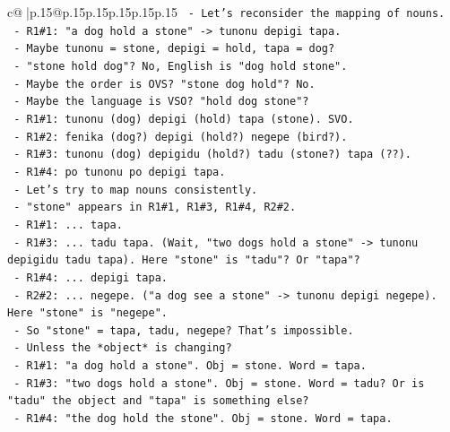 \documentclass{article}
\begin{document}
{\begin{supertabular}{c@{$\;$}|p{.15\linewidth}@{}p{.15\linewidth}p{.15\linewidth}p{.15\linewidth}p{.15\linewidth}p{.15\linewidth}}
{{{\texttt{              {-} Let's reconsider the mapping of nouns.} \\
\texttt{              {-} R1\#1: "a dog hold a stone" {-}> tunonu depigi tapa.} \\
\texttt{                {-} Maybe tunonu = stone, depigi = hold, tapa = dog?} \\
\texttt{                {-} "stone hold dog"? No, English is "dog hold stone".} \\
\texttt{                {-} Maybe the order is OVS? "stone dog hold"? No.} \\
\texttt{                {-} Maybe the language is VSO? "hold dog stone"?} \\
\texttt{                  {-} R1\#1: tunonu (dog) depigi (hold) tapa (stone). SVO.} \\
\texttt{                  {-} R1\#2: fenika (dog?) depigi (hold?) negepe (bird?).} \\
\texttt{                  {-} R1\#3: tunonu (dog) depigidu (hold?) tadu (stone?) tapa (??).} \\
\texttt{                  {-} R1\#4: po tunonu po depigi tapa.} \\
\texttt{              {-} Let's try to map nouns consistently.} \\
\texttt{                {-} "stone" appears in R1\#1, R1\#3, R1\#4, R2\#2.} \\
\texttt{                  {-} R1\#1: ... tapa.} \\
\texttt{                  {-} R1\#3: ... tadu tapa. (Wait, "two dogs hold a stone" {-}> tunonu depigidu tadu tapa). Here "stone" is "tadu"? Or "tapa"?} \\
\texttt{                  {-} R1\#4: ... depigi tapa.} \\
\texttt{                  {-} R2\#2: ... negepe. ("a dog see a stone" {-}> tunonu depigi negepe). Here "stone" is "negepe".} \\
\texttt{                  {-} So "stone" = tapa, tadu, negepe? That's impossible.} \\
\texttt{                  {-} Unless the *object* is changing?} \\
\texttt{                  {-} R1\#1: "a dog hold a stone". Obj = stone. Word = tapa.} \\
\texttt{                  {-} R1\#3: "two dogs hold a stone". Obj = stone. Word = tadu? Or is "tadu" the object and "tapa" is something else?} \\
\texttt{                  {-} R1\#4: "the dog hold the stone". Obj = stone. Word = tapa.} \\
}}}
\end{supertabular}}
\end{document}
